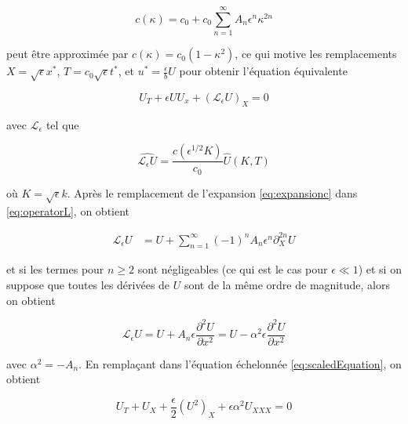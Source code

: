 \begin{equation}
\label{eq:expansionc}
c(\kappa) = c_0 + c_0 \sum_{n=1}^{\infty}A_n\epsilon^n\kappa^{2n}
\end{equation}

\noindent peut être approximée par  $c(\kappa) = c_0(1-\kappa^2)$, ce qui motive les remplacements $ X=\sqrt{\epsilon}x^*$, $T =c_0 \sqrt{\epsilon} t^*$, et $u^* = \frac{\epsilon}{ b} U$ pour obtenir l'équation équivalente   





\begin{equation}
\label{eq:scaledEquation}
 U_T + \epsilon U U_x+(\mathcal{L}_{\epsilon} U)_{X} = 0
 \end{equation}

\noindent avec $\mathcal{L}_\epsilon$ tel que 

\begin{equation}
\label{eq:operatorL}
\widehat{\mathcal{L}_\epsilon U} = \frac{c(\epsilon^{1/2} K)}{c_0} \hat{U}(K,T)
\end{equation}

\noindent où $K=\sqrt{\epsilon} k$. Après le remplacement de l'expansion \eqref{eq:expansionc} dans \eqref{eq:operatorL}, on obtient

\begin{align}
  \label{eq:expansionLe}
    \mathcal{L}_\epsilon U &=U +\sum_{n=1}^\infty (-1)^n A_n \epsilon^n \partial_X^{2n} U    
\end{align}

\noindent et si les termes pour $n\geq2$ sont négligeables (ce qui est le cas pour $\epsilon \ll 1 $) et si on suppose que toutes les dérivées de $U$ sont de la même ordre de magnitude, alors on obtient

\begin{equation*}
    \mathcal{L}_\epsilon U = U + A_n \epsilon \frac{\partial^2 U}{\partial x^2} = U - \alpha^2 \epsilon \frac{\partial^2 U}{\partial x^2}
\end{equation*}

\noindent avec $\alpha^2 = - A_n$. En remplaçant dans l'équation échelonnée \eqref{eq:scaledEquation}, on obtient

$$U_T + U_X + \frac{\epsilon}{2} (U^2)_X + \epsilon\alpha^2U_{XXX} = 0$$

